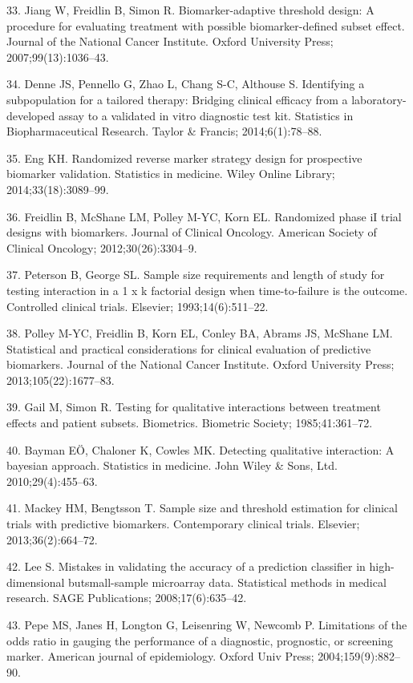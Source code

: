 \documentclass[11pt]{article}
\begin{document}
33. Jiang W, Freidlin B, Simon R. Biomarker-adaptive threshold design: A
procedure for evaluating treatment with possible biomarker-defined
subset effect. Journal of the National Cancer Institute. Oxford
University Press; 2007;99(13):1036--43.

34. Denne JS, Pennello G, Zhao L, Chang S-C, Althouse S. Identifying a
subpopulation for a tailored therapy: Bridging clinical efficacy from a
laboratory-developed assay to a validated in vitro diagnostic test kit.
Statistics in Biopharmaceutical Research. Taylor \& Francis;
2014;6(1):78--88.

35. Eng KH. Randomized reverse marker strategy design for prospective
biomarker validation. Statistics in medicine. Wiley Online Library;
2014;33(18):3089--99.

36. Freidlin B, McShane LM, Polley M-YC, Korn EL. Randomized phase iI
trial designs with biomarkers. Journal of Clinical Oncology. American
Society of Clinical Oncology; 2012;30(26):3304--9.

37. Peterson B, George SL. Sample size requirements and length of study
for testing interaction in a 1 x k factorial design when time-to-failure
is the outcome. Controlled clinical trials. Elsevier;
1993;14(6):511--22.

38. Polley M-YC, Freidlin B, Korn EL, Conley BA, Abrams JS, McShane LM.
Statistical and practical considerations for clinical evaluation of
predictive biomarkers. Journal of the National Cancer Institute. Oxford
University Press; 2013;105(22):1677--83.

39. Gail M, Simon R. Testing for qualitative interactions between
treatment effects and patient subsets. Biometrics. Biometric Society;
1985;41:361--72.

40. Bayman EÖ, Chaloner K, Cowles MK. Detecting qualitative interaction:
A bayesian approach. Statistics in medicine. John Wiley \& Sons, Ltd.
2010;29(4):455--63.

41. Mackey HM, Bengtsson T. Sample size and threshold estimation for
clinical trials with predictive biomarkers. Contemporary clinical
trials. Elsevier; 2013;36(2):664--72.

42. Lee S. Mistakes in validating the accuracy of a prediction
classifier in high-dimensional butsmall-sample microarray data.
Statistical methods in medical research. SAGE Publications;
2008;17(6):635--42.

43. Pepe MS, Janes H, Longton G, Leisenring W, Newcomb P. Limitations of
the odds ratio in gauging the performance of a diagnostic, prognostic,
or screening marker. American journal of epidemiology. Oxford Univ
Press; 2004;159(9):882--90.
\end{document}
